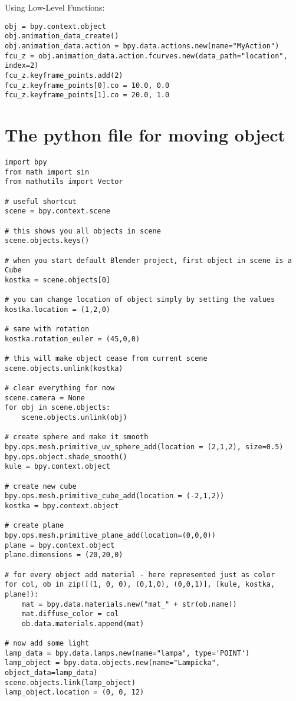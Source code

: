 Using Low-Level Functions:

\begin{verbatim}
obj = bpy.context.object
obj.animation_data_create()
obj.animation_data.action = bpy.data.actions.new(name="MyAction")
fcu_z = obj.animation_data.action.fcurves.new(data_path="location", index=2)
fcu_z.keyframe_points.add(2)
fcu_z.keyframe_points[0].co = 10.0, 0.0
fcu_z.keyframe_points[1].co = 20.0, 1.0
\end{verbatim}


\section{The python file for moving object}
\begin{verbatim}
import bpy  
from math import sin
from mathutils import Vector

# useful shortcut
scene = bpy.context.scene

# this shows you all objects in scene
scene.objects.keys()

# when you start default Blender project, first object in scene is a Cube
kostka = scene.objects[0]

# you can change location of object simply by setting the values
kostka.location = (1,2,0)

# same with rotation
kostka.rotation_euler = (45,0,0)

# this will make object cease from current scene
scene.objects.unlink(kostka)

# clear everything for now
scene.camera = None  
for obj in scene.objects:  
    scene.objects.unlink(obj)

# create sphere and make it smooth
bpy.ops.mesh.primitive_uv_sphere_add(location = (2,1,2), size=0.5)  
bpy.ops.object.shade_smooth()  
kule = bpy.context.object

# create new cube
bpy.ops.mesh.primitive_cube_add(location = (-2,1,2))  
kostka = bpy.context.object

# create plane 
bpy.ops.mesh.primitive_plane_add(location=(0,0,0))  
plane = bpy.context.object  
plane.dimensions = (20,20,0)

# for every object add material - here represented just as color
for col, ob in zip([(1, 0, 0), (0,1,0), (0,0,1)], [kule, kostka, plane]):  
    mat = bpy.data.materials.new("mat_" + str(ob.name))
    mat.diffuse_color = col
    ob.data.materials.append(mat)

# now add some light
lamp_data = bpy.data.lamps.new(name="lampa", type='POINT')  
lamp_object = bpy.data.objects.new(name="Lampicka", object_data=lamp_data)  
scene.objects.link(lamp_object)  
lamp_object.location = (0, 0, 12)


\end{verbatim}
